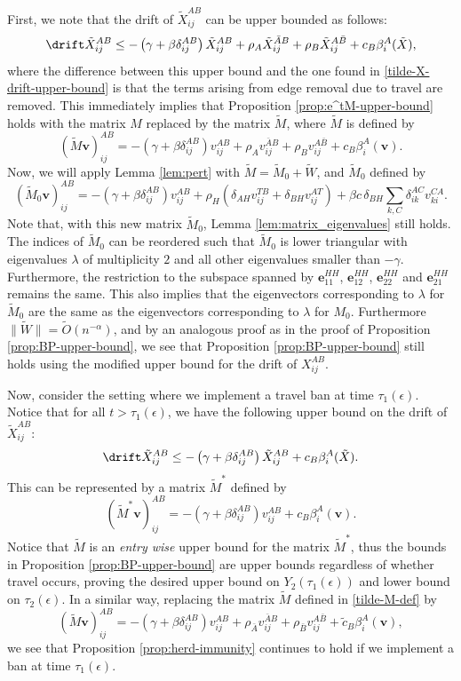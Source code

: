 \documentclass[11pt]{article}
\begin{document}
First, we note that the drift of $\tilde X_{ij}^{AB}$ can be upper bounded as follows:
\[
 \drift \tilde X_{ij}^{AB}\leq
 -\left(\gamma+\beta \delta_{ij}^{AB}\right) \tilde X_{ij}^{AB}
+\rho_{ A}\tilde X_{ij}^{\bar A B}+\rho_{B}\tilde X_{ij}^{A\bar B}
+c_B\beta_i^A (\tilde X),   
\]
where the difference between this upper bound and the one found in \eqref{tilde-X-drift-upper-bound} is that the terms arising from edge removal due to travel are removed. This immediately implies that Proposition \ref{prop:e^tM-upper-bound} holds with the matrix $M$ replaced by the matrix $\tilde M$, where $\tilde M$ is defined by
\[
(\tilde M\mathbf v)_{ij}^{AB}=
-\left(\gamma+\beta \delta_{ij}^{AB}\right) v_{ij}^{AB}
+\rho_{A}v_{ij}^{\bar A B}+\rho_{B}v_{ij}^{A\bar B}
+c_B\beta_i^A (\mathbf v).
\]
Now, we will apply Lemma \ref{lem:pert} with $\tilde M = \tilde M_0 + \tilde W$, and $\tilde M_0$ defined by
\[
    (\tilde M_0 \mathbf v)_{ij}^{AB}=
 -\left(\gamma+\beta \delta_{ij}^{AB}\right)v_{ij}^{AB}
+\rho_H\left(\delta_{AH}v_{ij}^{T B}+\delta_{BH}v_{ij}^{AT}\right)
+\beta c \,\delta_{BH}\sum_{k,C}\delta_{ik}^{AC}v_{ki}^{CA}.
\]
Note that, with this new matrix $\tilde M_0$, Lemma \ref{lem:matrix_eigenvalues} still holds. The indices of $\tilde M_0$ can be reordered such that $\tilde M_0$ is lower triangular with eigenvalues $\lambda$ of multiplicity $2$ and all other eigenvalues smaller than $-\gamma$. Furthermore, the restriction to the subspace spanned by $\mathbf e_{11}^{HH}$,   $\mathbf e_{12}^{HH}$,   $\mathbf e_{22}^{HH}$ and  $\mathbf e_{21}^{HH}$ remains the same. This also implies that the eigenvectors corresponding to $\lambda$ for $\tilde M_0$ are the same as the eigenvectors corresponding to $\lambda$ for $M_0$. Furthermore $\|\tilde W \| = \tilde O(n^{-\alpha})$, and by an analogous proof as in the proof of Proposition \ref{prop:BP-upper-bound}, we see that Proposition \ref{prop:BP-upper-bound} still holds using the modified upper bound for the drift of $X_{ij}^{AB}$.

Now, consider the setting where we implement a travel ban at time $\tau_1(\epsilon)$. Notice that for all $t > \tau_1(\epsilon)$, we have the following upper bound on the drift of $\tilde X_{ij}^{AB}$:
\[
 \drift \tilde X_{ij}^{AB}\leq
 -\left(\gamma+\beta \delta_{ij}^{AB}\right) \tilde X_{ij}^{AB}+c_B\beta_i^A (\tilde X).  
\]
This can be represented by a matrix $\tilde M^*$ defined by
\[
(\tilde M^*\mathbf v)_{ij}^{AB}=
-\left(\gamma+\beta \delta_{ij}^{AB}\right) v_{ij}^{AB}+c_B\beta_i^A (\mathbf v).
\]
Notice that $\tilde M$ is an \textit{entry wise} upper bound for the matrix $\tilde M^*$, thus the bounds in Proposition \ref{prop:BP-upper-bound} are upper bounds regardless of whether travel occurs, proving the desired  upper bound on $Y_2(\tau_1(\epsilon))$ and lower bound on $\tau_2(\epsilon)$.
In a similar way,
replacing the matrix $\tilde M$ defined in \eqref{tilde-M-def} by
$$
    (\tilde M\mathbf v)_{ij}^{AB}=
    -\left(\gamma+\beta \delta_{ij}^{AB}\right) v_{ij}^{AB}
    +\rho_{\bar A}v_{ij}^{\bar A B}+\rho_{\bar B}v_{ij}^{A\bar B}
    +\tilde c_B\beta_i^A (\mathbf v),     
$$
we see that Proposition \ref{prop:herd-immunity} continues to hold if we implement a ban at time $\tau_1(\epsilon)$.
\end{document}
